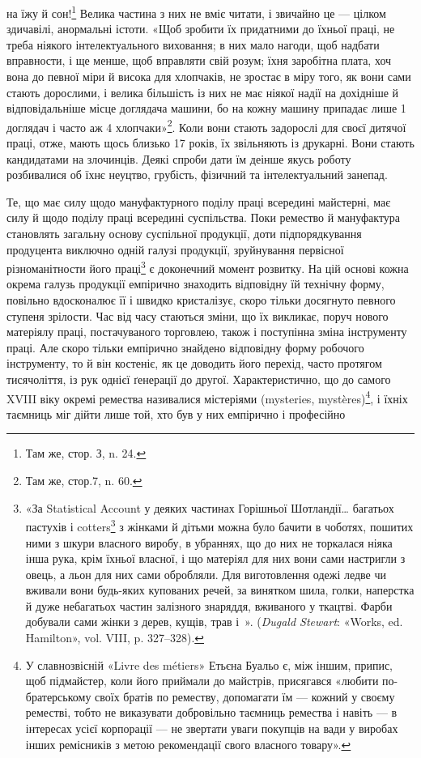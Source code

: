 \parcont{}  %
на їжу й сон!\footnote{
Там же, стор. З, n. 24.
} Велика частина з них не вміє читати, і звичайно
це — цілком здичавілі, анормальні істоти. «Щоб зробити їх
придатними до їхньої праці, не треба ніякого інтелектуального
виховання; в них мало нагоди, щоб надбати вправности, і ще
менше, щоб вправляти свій розум; їхня заробітна плата, хоч вона
до певної міри й висока для хлопчаків, не зростає в міру того, як
вони сами стають дорослими, і велика більшість із них не має
ніякої надії на дохідніше й відповідальніше місце доглядача
машини, бо на кожну машину припадає лише 1 доглядач і часто
аж 4 хлопчаки»\footnote{
Там же, стор.7, n. 60.
}. Коли вони стають задорослі для своєї
дитячої праці, отже, мають щось близько 17 років, їх звільняють
із друкарні. Вони стають кандидатами на злочинців. Деякі спроби
дати їм деінше якусь роботу розбивалися об їхнє неуцтво, грубість,
фізичний та інтелектуальний занепад.

Те, що має силу щодо мануфактурного поділу праці всередині
майстерні, має силу й щодо поділу праці всередині суспільства.
Поки ремество й мануфактура становлять загальну основу суспільної
продукції, доти підпорядкування продуцента виключно
одній галузі продукції, зруйнування первісної різноманітности
його праці\footnote{
«За Statistical Account у деяких частинах Горішньої Шотландії\dots{}
багатьох пастухів і cotters\footnote*{
— селян. \emph{Ред.}
} з жінками й дітьми можна було бачити
в чоботях, пошитих ними з шкури власного виробу, в убраннях, що до
них не торкалася ніяка інша рука, крім їхньої власної, і що матеріял
для них вони сами настригли з овець, а льон для них сами обробляли.
Для виготовлення одежі ледве чи вживали вони будь-яких купованих
речей, за винятком шила, голки, наперстка й дуже небагатьох частин
залізного знаряддя, вживаного у ткацтві. Фарби добували сами жінки з
дерев, кущів, трав і~». (\emph{Dugald Stewart}: «Works, ed. Hamilton»,
vol. VIII, p. 327--328).
} є доконечний момент розвитку. На цій основі
кожна окрема галузь продукції емпірично знаходить відповідну
їй технічну форму, повільно вдосконалює її і швидко кристалізує,
скоро тільки досягнуто певного ступеня зрілости. Час від
часу стаються зміни, що їх викликає, поруч нового матеріялу
праці, постачуваного торговлею, також і поступінна зміна інструменту
праці. Але скоро тільки емпірично знайдено відповідну
форму робочого інструменту, то й він костеніє, як це доводить
його перехід, часто протягом тисячоліття, із рук однієї ґенерації
до другої. Характеристично, що до самого XVIII віку окремі
ремества називалися містеріями (mysteries, mystères)\footnote{
У славнозвісній «Livre des métiers» Етьєна Буальо є, між іншим,
припис, щоб підмайстер, коли його приймали до майстрів, присягався
«любити по-братерському своїх братів по реместву, допомагати їм —
кожний у своєму реместві, тобто не виказувати добровільно таємниць
ремества і навіть — в інтересах усієї корпорації — не звертати уваги
покупців на вади у виробах інших ремісників з метою рекомендації свого
власного товару».
}, і їхніх таємниць міг дійти лише той, хто був у них емпірично і професійно
\parbreak{}  %
